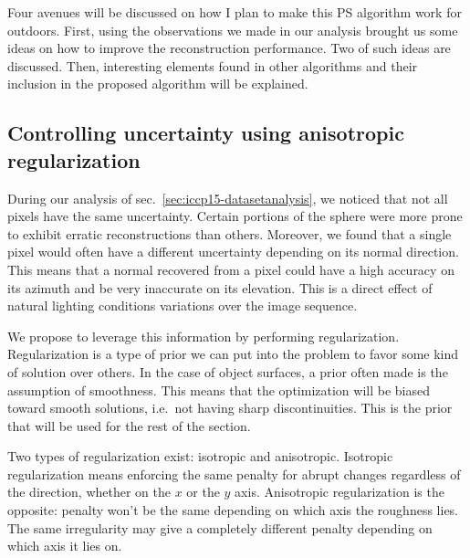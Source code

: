 
Four avenues will be discussed on how I plan to make this PS algorithm work for outdoors. First, using the observations we made in our analysis brought us some ideas on how to improve the reconstruction performance. Two of such ideas are discussed. Then, interesting elements found in other algorithms and their inclusion in the proposed algorithm will be explained.

\subsection{Controlling uncertainty using anisotropic regularization}
\label{subsec:reg}

During our analysis of sec.~\ref{sec:iccp15-datasetanalysis}, we noticed that not all pixels have the same uncertainty. Certain portions of the sphere were more prone to exhibit erratic reconstructions than others. Moreover, we found that a single pixel would often have a different uncertainty depending on its normal direction. This means that a normal recovered from a pixel could have a high accuracy on its azimuth and be very inaccurate on its elevation. This is a direct effect of natural lighting conditions variations over the image sequence.

We propose to leverage this information by performing regularization. Regularization is a type of prior we can put into the problem to favor some kind of solution over others. In the case of object surfaces, a prior often made is the assumption of smoothness. This means that the optimization will be biased toward smooth solutions, i.e.\ not having sharp discontinuities. This is the prior that will be used for the rest of the section.

Two types of regularization exist: isotropic and anisotropic. Isotropic regularization means enforcing the same penalty for abrupt changes regardless of the direction, whether on the $x$ or the $y$ axis. Anisotropic regularization is the opposite: penalty won't be the same depending on which axis the roughness lies. The same irregularity may give a completely different penalty depending on which axis it lies on.

